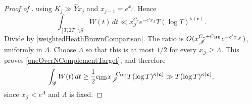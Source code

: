\documentclass[oneside, 12pt]{amsart}
\theoremstyle{definition}
\begin{document}
{\begin{proof}[Proof of ]
			using $K_j\gg\widehat Yx_j$ and $x_{j-1}=e^{x_j}$.  Hence
			\begin{equation}\label{oneOverNBadSetRemoval}
				\int_{[T,2T]\setminus\mathscr G}W(t)\,dt
				\ll x_{\mathscr J}^{C_*}e^{-c'x_{\mathscr J}}
				T(\log T)^{\kappa(\boldsymbol c)}.
			\end{equation}
			Divide by \eqref{weightedHeathBrownComparison}.  The ratio is
			$O(x_{\mathscr J}^{C_*+C_{\rm HB}}e^{-c'x_{\mathscr J}})$, uniformly
			in $\Lambda$.  Choose $\Lambda$ so that this is at most $1/2$
			for every $x_{\mathscr J}\geq\Lambda$.  This proves
			\eqref{oneOverNComplementTarget}, and therefore
			\[
			\int_{\mathscr G}W(t)\,dt
			\geq\frac12c_{\rm HB}x_{\mathscr J}^{-C_{\rm HB}}
			T(\log T)^{\kappa(\boldsymbol c)}
			\gg T(\log T)^{\kappa(\boldsymbol c)},
			\]
			since $x_{\mathscr J}<e^\Lambda$ and $\Lambda$ is fixed.
		\end{proof}
		
	}
	
	\appendix
	
\end{document}
